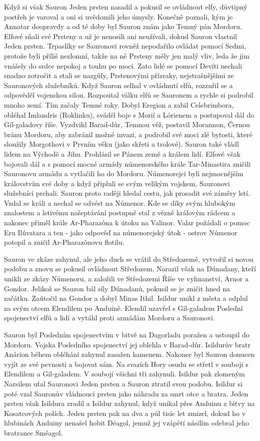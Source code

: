 \documentclass[12pt]{report}
\begin{document}
Když si však Sauron Jeden prsten nasadil a pokusil se ovládnout elfy, důvtipný postřeh je varoval a oni si uvědomili jeho úmysly. Konečně poznali, kým je Annatar doopravdy a od té doby byl Sauron znám jako Temný pán Mordoru. Elfové sňali své Prsteny a už je nenosili ani neužívali, dokud Sauron vlastnil Jeden prsten. Trpaslíky se Sauronovi rovněž nepodařilo ovládat pomocí Sedmi, protože byli příliš nezlomní, takže na ně Prsteny měly jen malý vliv, leda že jim vnášely do srdce nepokoj a touhu po moci. Zato lidé se pomocí Devíti nechali snadno zotročit a stali se nazgûly, Prstenovými přízraky, nejstrašnějšími ze Sauronových služebníků. Když Sauron selhal v ovládnutí elfů, rozzuřil se a odpověděl vojenskou silou. Rozpoutal válku elfů se Sauronem a rychle si podrobil mnoho zemí. Tím začaly Temné roky. Dobyl Eregion a zabil Celebrimbora, obléhal Imlandris (Roklinku), sváděl boje s Morií a Lórienem a postupoval dál do Gil-galadovy říše. Vyzdvihl Barad-dûr, Temnou věž, postavil Morannon, Černou bránu Mordoru, aby zabránil možné invazi, a podrobil své moci zlé bytosti, které sloužily Morgothovi v Prvním věku (jako skřeti a trolové). Sauron také vládl lidem na Východě a Jihu. Prohlásil se Pánem země a králem lidí. Elfové však bojovali dál a s pomocí mocné armády númenorského krále Tar-Minastira zničili Sauronovu armádu a vytlačili ho do Mordoru. Númenorejci byli nejmocnějším královstvím své doby a když připluli se svým velikým vojskem, Sauronovi služebníci prchali. Sauron proto raději hledal cestu, jak prosadit své záměry lstí. Vzdal se králi a nechal se odvést na Númenor. Kde se díky svým hlubokým znalostem a lstivému našeptávání postupně stal z vězně královým rádcem a nakonec přiměl krále Ar-Pharazôna k útoku na Valinor. Valar požádali o pomoc Eru Ilúvatara a ten - jako odpověď na númenorejský útok - ostrov Númenor potopil a zničil Ar-Pharazônovu flotilu.

Sauron ve zkáze zahynul, ale jeho duch se vrátil do Středozemě, vytvořil si novou podobu a znovu se pokusil ovládnout Středozem. Narazil však na Dúnadany, kteří unikli ze zkázy Númenoru, a založili ve Středozemi Říše ve vyhnanství, Arnor a Gondor. Jelikož se Sauron bál síly Dúnadanů, pokusil se je zničit hned na začátku. Zaútočil na Gondor a dobyl Minas Ithil. Isildur unikl z města a odplul za svým otcem Elendilem po Anduině. Elendil uzavřel s Gil-galadem Poslední spojenectví elfů a lidí a vytáhl proti armádám Mordoru a Sauronovi.

Sauron byl Posledním spojenectvím v bitvě na Dagorladu poražen a ustoupil do Mordoru. Vojska Posledního spojenectví jej oblehla v Barad-dûr. Isildurův bratr Anárion během obléhání zahynul zasažen kamenem. Nakonec byl Sauron donucen vyjít ze své pevnosti a bojovat sám. Na svazích Hory osudu se střetl v souboji s Elendilem a Gil-galadem. V souboji všichni tři zahynuli. Isildur pak zlomeným Narsilem uťal Sauronovi Jeden prsten a Sauron ztratil svou podobu. Isildur si poté vzal Sauronův vládnoucí prsten jako náhradu za smrt otce a bratra. Jeden prsten však Isildura zradil a Isildur zahynul, když unikal přes Anduinu z bitvy na Kosatcových polích. Jeden prsten pak na dva a půl tisíc let zmizel, dokud ho v hlubinách Anduiny nenašel hobit Déagol, jemuž jej vzápětí násilím odebral jeho bratranec Sméagol. 
\end{document}
